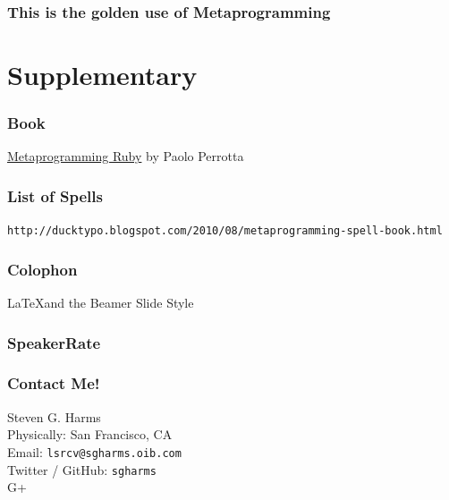 \documentclass[slidestop,compress,mathserif]{beamer}
\begin{document}
\begin{frame}
	\frametitle{This is the golden use of Metaprogramming}
\end{frame}







\section{Supplementary} %
\label{sec:supplementary}

\begin{frame}
	\frametitle{Book}
	\underline{Metaprogramming Ruby} by Paolo Perrotta
\end{frame}

\begin{frame}
	\frametitle{List of Spells}
	\texttt{http://ducktypo.blogspot.com/2010/08/metaprogramming-spell-book.html}
\end{frame}

\begin{frame}
	\frametitle{Colophon}
	\LaTeX and the Beamer Slide Style
\end{frame}



\begin{frame}
	\frametitle{SpeakerRate}
	\vskip 1.25cm
\end{frame}

\begin{frame}
	\frametitle{Contact Me!}
	\begin{center}
		Steven G. Harms \\
		\vskip 1.25cm	
		Physically:  San Francisco, CA\\
		Email:  \texttt{lsrcv@sgharms.oib.com} \\
		Twitter / GitHub:  \texttt{sgharms} \\
		G+
	\end{center}
\end{frame}
\end{document}
